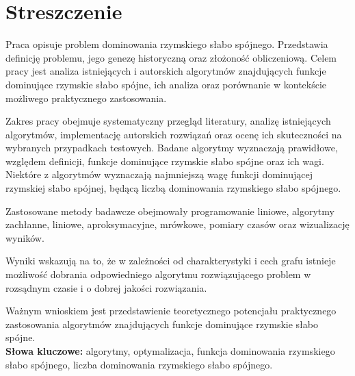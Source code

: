 \chapter*{Streszczenie}
Praca opisuje problem dominowania rzymskiego słabo spójnego. Przedstawia definicję problemu, jego genezę historyczną oraz złożoność obliczeniową. Celem pracy jest analiza istniejących i autorskich algorytmów znajdujących funkcje dominujące rzymskie słabo spójne, ich analiza oraz porównanie w kontekście możliwego praktycznego zastosowania.

Zakres pracy obejmuje systematyczny przegląd literatury, analizę istniejących algorytmów, implementację autorskich rozwiązań oraz ocenę ich skuteczności na wybranych przypadkach testowych. Badane algorytmy wyznaczają prawidłowe, względem definicji, funkcje dominujące rzymskie słabo spójne oraz ich wagi. Niektóre z algorytmów wyznaczają najmniejszą wagę funkcji dominującej rzymskiej słabo spójnej, będącą liczbą dominowania rzymskiego słabo spójnego.

Zastosowane metody badawcze obejmowały programowanie liniowe, algorytmy zachłanne, liniowe, aproksymacyjne, mrówkowe, pomiary czasów oraz wizualizację wyników.

Wyniki wskazują na to, że w zależności od charakterystyki i cech grafu istnieje możliwość dobrania odpowiedniego algorytmu rozwiązującego problem w rozsądnym czasie i o dobrej jakości rozwiązania.

Ważnym wnioskiem jest przedstawienie teoretycznego potencjału praktycznego zastosowania algorytmów znajdujących funkcje dominujące rzymskie słabo spójne.\\

\textbf{Słowa kluczowe:} algorytmy, optymalizacja, funkcja dominowania rzymskiego słabo spójnego, liczba dominowania rzymskiego słabo spójnego.
